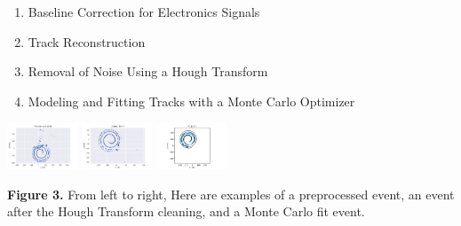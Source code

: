 \documentclass[ansiepaper,portrait]{baposter}
\begin{document}
\begin{poster}
{{\begin{enumerate}\itemsep-0.2em
\item Baseline Correction for Electronics Signals
\item Track Reconstruction
\item Removal of Noise Using a Hough Transform
\item Modeling and Fitting Tracks with a Monte Carlo Optimizer
\end{enumerate}

\begin{center}
\includegraphics [width=21mm] {preprocess_evt.pdf}
\hspace{.3cm}
\includegraphics [width=21mm] {clean_evt.pdf}
\hspace{.3cm}
\includegraphics [width=21mm] {fit_evt.pdf}
\end{center}
\textbf{Figure 3.} From left to right,  Here are examples of a preprocessed event, an event after the Hough Transform cleaning, and a Monte Carlo fit event.}


} 


\end{poster}
\end{document}
